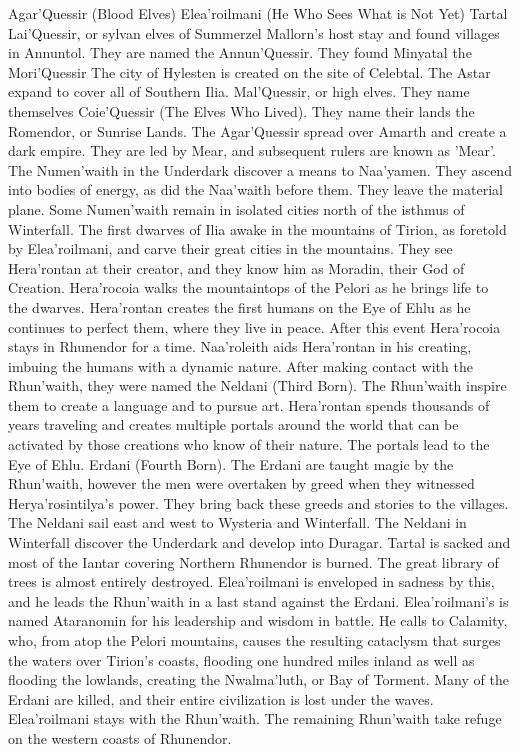 \documentclass[smalldemyvopaper,11pt,twoside,onecolumn,openright,extrafontsizes]{memoir}
\begin{document}
Agar'Quessir (Blood Elves)
Elea'roilmani (He Who Sees What is Not Yet)
Tartal
Lai'Quessir, or sylvan elves of Summerzel
Mallorn's host stay and found villages in Annuntol. They are named the Annun'Quessir. They found Minyatal
the Mori'Quessir
The city of Hylesten is created on the site of Celebtal. The Astar expand to cover all of Southern Ilia.
Mal'Quessir, or high elves.
They name themselves Coie'Quessir (The Elves Who Lived). They name their lands the Romendor, or Sunrise Lands.
The Agar'Quessir spread over Amarth and create a dark empire. They are led by Mear, and subsequent rulers are known as 'Mear'.
The Numen'waith in the Underdark discover a means to Naa'yamen. They ascend into bodies of energy, as did the Naa'waith before them. They leave the material plane. Some Numen’waith remain in isolated cities north of the isthmus of Winterfall.
The first dwarves of Ilia awake in the mountains of Tirion, as foretold by Elea'roilmani, and carve their great cities in the mountains. They see Hera’rontan at their creator, and they know him as Moradin, their God of Creation. Hera'rocoia walks the mountaintops of the Pelori as he brings life to the dwarves. Hera'rontan creates the first humans on the Eye of Ehlu as he continues to perfect them, where they live in peace. After this event Hera'rocoia stays in Rhunendor for a time. Naa'roleith aids Hera'rontan in his creating, imbuing the humans with a dynamic nature.
After making contact with the Rhun'waith, they were named the Neldani (Third Born). The Rhun’waith inspire them to create a language and to pursue art.
Hera'rontan spends thousands of years traveling and creates multiple portals around the world that can be activated by those creations who know of their nature. The portals lead to the Eye of Ehlu.
Erdani (Fourth Born).
The Erdani are taught magic by the Rhun'waith, however the men were overtaken by greed when they witnessed Herya'rosintilya's power. They bring back these greeds and stories to the villages.
The Neldani sail east and west to Wysteria and Winterfall. The Neldani in Winterfall discover the Underdark and develop into Duragar.
Tartal is sacked and most of the Iantar covering Northern Rhunendor is burned. The great library of trees is almost entirely destroyed. Elea'roilmani is enveloped in sadness by this, and he leads the Rhun'waith in a last stand against the Erdani. Elea'roilmani's is named Ataranomin for his leadership and wisdom in battle. He calls to Calamity, who, from atop the Pelori mountains, causes the resulting cataclysm that surges the waters over Tirion's coasts, flooding one hundred miles inland as well as flooding the lowlands, creating the Nwalma'luth, or Bay of Torment. Many of the Erdani are killed, and their entire civilization is lost under the waves. Elea'roilmani stays with the Rhun'waith.
The remaining Rhun'waith take refuge on the western coasts of Rhunendor.
\end{document}
